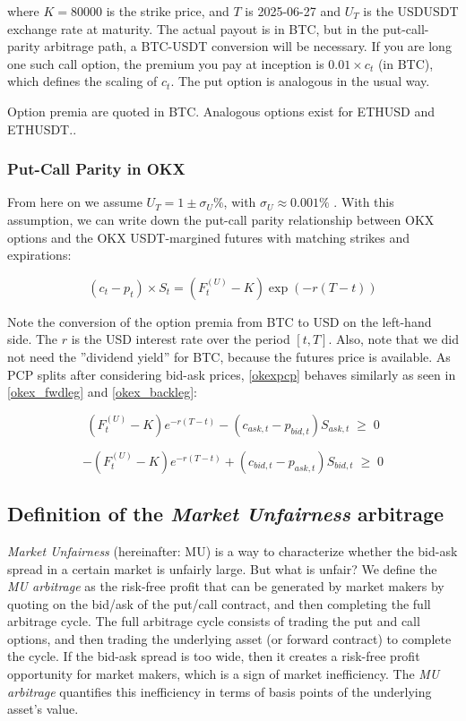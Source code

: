 \documentclass[12pt]{article}
\begin{document}
where $K=80000$ is the strike price, and $T$ is 2025-06-27 and $U_T$ is the USDUSDT exchange rate at maturity. The actual payout is in BTC, but in the put-call-parity arbitrage path, a BTC-USDT conversion will be necessary. If you are long one such call option, the premium you pay at inception is $0.01 \times c_t$ (in BTC), which defines the scaling of $c_t$. The put option is analogous in the usual way.

Option premia are quoted in BTC. Analogous options exist for ETHUSD and ETHUSDT.\citet{okx_options}.

\subsubsection{Put-Call Parity in OKX}

From here on we assume $U_T=1 \pm \sigma_U\%$, with $\sigma_U\approx0.001\%$ \citep{usd_vs_usdt}. With this assumption, we can write down the put-call parity relationship between OKX options and the OKX USDT-margined futures with matching strikes and expirations:

    \begin{equation} \label{okexpcp}
    (c_t - p_t)\times S_t = (F^{(U)}_t - K)\exp\left(-r(T-t)\right)
    \end{equation}

Note the conversion of the option premia from BTC to USD on the left-hand side. The $r$ is the USD interest rate over the period $[t,T]$. Also, note that we did not need the ''dividend yield'' for BTC, because the futures price is available.
As PCP splits after considering bid-ask prices, \ref{okexpcp} behaves similarly as seen in \ref{okex_fwdleg} and \ref{okex_backleg}:

\begin{equation}\label{okex_fwdleg}
(F^{(U)}_t - K)e^{-r(T-t)}
- (c_{ask,t} - p_{bid,t}) S_{ask,t}
\;\geq\; 0
\end{equation}

\begin{equation}\label{okex_backleg}
- (F^{(U)}_t - K)e^{-r(T-t)}
+ (c_{bid,t} - p_{ask,t}) S_{bid,t}
\;\geq\; 0
\end{equation}


\subsection{Definition of the \textit{Market Unfairness} arbitrage}

\textit{Market Unfairness} (hereinafter: MU) is a way to characterize whether the bid-ask spread in a certain market is unfairly large. But what is unfair? We define the \textit{MU arbitrage} as the risk-free profit that can be generated by market makers by quoting on the bid/ask of the put/call contract, and then completing the full arbitrage cycle. The full arbitrage cycle consists of trading the put and call options, and then trading the underlying asset (or forward contract) to complete the cycle. If the bid-ask spread is too wide, then it creates a risk-free profit opportunity for market makers, which is a sign of market inefficiency. The \textit{MU arbitrage} quantifies this inefficiency in terms of basis points of the underlying asset's value.
\end{document}
